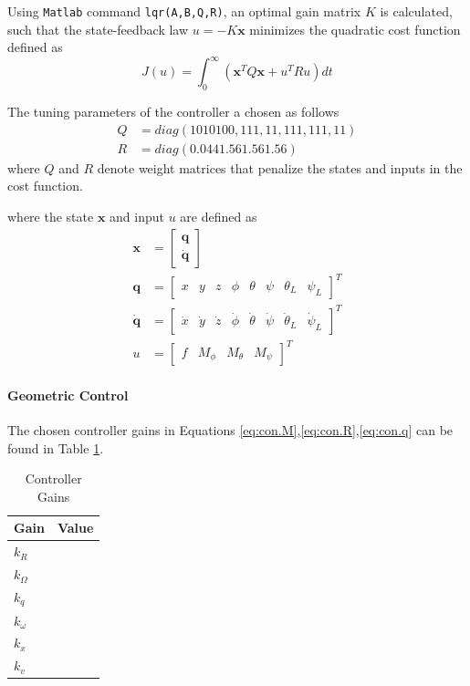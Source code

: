 Using \texttt{Matlab} command \texttt{lqr(A,B,Q,R)}, an optimal gain matrix $ K $ is calculated, such that the state-feedback law $ u=-K\mathbf{x} $ minimizes the quadratic cost function defined as
\begin{equation}\label{key}
J(u)=\int_{0}^{\infty}(\mathbf{x}^TQ\mathbf{x}+u^TRu)dt
\end{equation}

The tuning parameters of the  controller a chosen as follows
\begin{equation}\label{key}
	\begin{aligned}
	Q &= diag(10 10 100, 1 1 1, 1 1, 1 1 1, 1 1 1, 1 1)\\
	R &= diag(0.044 1.56 1.56 1.56)
	\end{aligned}
\end{equation}
where $ Q $ and $ R $ denote weight matrices that penalize the states and inputs in the cost function.



where the state $ \mathbf{x} $ and input $ u $ are defined as 
\begin{align}\label{eq:state}
\textbf{x}&=\begin{bmatrix}
\textbf{q}\\
\mathbf{\dot{q}}
\end{bmatrix}\\
\mathbf{q}&=\begin{bmatrix}
x&y&z&\phi&\theta&\psi&\theta_L&\psi_L
\end{bmatrix}^T\\
\mathbf{\dot{q}}&=\begin{bmatrix}
\dot{x}&\dot{y}&\dot{z}&\dot{\phi}&\dot{\theta}&\dot{\psi}&\dot{\theta}_L&\dot{\psi}_L
\end{bmatrix}^T\\
u&=\begin{bmatrix}
f&M_\phi&M_\theta&M_\psi
\end{bmatrix}^T
\end{align}

\paragraph{Geometric Control}
The chosen controller gains in Equations \ref{eq:con.M},\ref{eq:con.R},\ref{eq:con.q} can be found in Table \ref{tab:set.gains}.

\begin{table}[h!]
	\centering
	\begin{tabular}{|l|l|}
		\hline
		\textbf{Gain}&\textbf{Value}\\
		\hline
		$ k_R $&\\
		$ k_\Omega $&\\
		$ k_q $&\\
		$ k_\omega $&\\
		$ k_x $&\\
		$ k_v $&\\	
		\hline
	\end{tabular}
	\caption{Controller Gains}
	\label{tab:set.gains}
\end{table}

